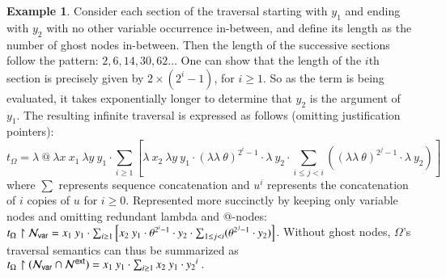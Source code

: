 \documentclass{elsarticle}
\theoremstyle{plain}
\theoremstyle{definition}
\newtheorem{example}{Example}[section]
\newcommand\Nodes{\mathcal{N}}%
\newcommand\NodesVar{\Nodes_{\sf var}}%
\newcommand{\ghostlmd}{{\lambda\!\!\lambda}}
\newcommand{\ghostvar}{\theta}
\newcommand{\ExternalNodes}{\Nodes^{\sf ext}}
\begin{document}
\begin{example}
    Consider each section of the traversal starting with $y_1$ and ending with $y_2$ with no other variable occurrence in-between, and define its length as the number of ghost nodes in-between. Then the length of the successive sections follow the pattern: $2,6,14,30,62\ldots$
    One can show that the length of the $i$th section is precisely given by $2\times(2^i-1)$, for $i\geq1$.
    So as the term is being evaluated, it takes exponentially longer to determine that $y_2$ is the argument of $y_1$.
    The resulting infinite traversal is expressed as follows (omitting justification pointers):
    \begin{equation*}
    t_\Omega = \lambda ~ @ ~ \lambda x ~  x_1 ~ \lambda y ~ y_1
    \cdot  \sum_{i\geq 1}
        \left[
            \lambda ~ x_2 ~ \lambda y ~ y_1 \cdot
             {(\ghostlmd\ \ghostvar)}^{2^i -1}\cdot \lambda ~ y_2
                 \cdot \sum_{i\leq j<i}
                    \left(
                        {(\ghostlmd\ \ghostvar)}^{2^j -1}
                        \cdot
                        \lambda ~ y_2
                    \right)
        \right]
    \end{equation*}
    where $\sum$ represents sequence concatenation and $u^i$ represents the concatenation of $i$ copies of $u$ for $i\geq 0$.
    Represented more succinctly by keeping only variable nodes and omitting redundant lambda and @-nodes:
    $t_\Omega \filter \NodesVar =  x_1 ~ y_1
        \cdot  \sum_{i\geq 1}
            \left[
                x_2 ~ y_1 \cdot
                 \ghostvar^{2^i -1}\cdot y_2 \cdot
                     \sum_{1\leq j <i} (\ghostvar^{2^j -1} \cdot y_2)
            \right]
    $.
    Without ghost nodes, $\Omega$'s traversal semantics can thus be summarized as
    $
        t_\Omega \filter (\NodesVar\inter\ExternalNodes) =  x_1 ~ y_1
        \cdot  \sum_{i\geq 1} x_2 ~ y_1 \cdot {y_2}^i \ .
    $
\end{example}
\end{document}
